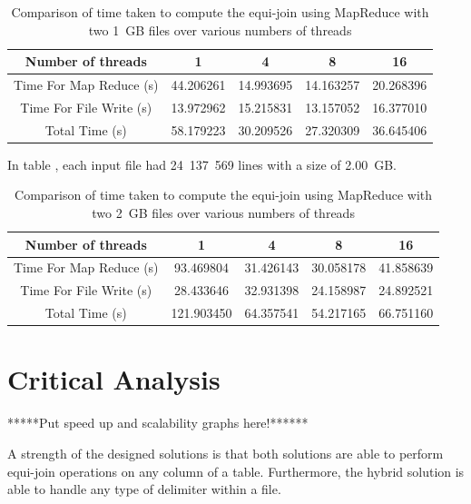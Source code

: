 \documentclass[10pt,twocolumn]{witseiepaper}
\begin{document}
\begin{table} [t]
	\centering
	\caption{Comparison of time taken to compute the equi-join using MapReduce with two 1~GB files over various numbers of threads}
	\label{tab:results2}
	
	\begin{tabular}{|c|c|c|c|c|}
		\hline 
		Number of threads & 1 & 4 & 8 &16\\ 
		\hline
		\hline
		Time For Map Reduce (s) & 44.206261 & 14.993695 & 14.163257 &20.268396\\ 
		\hline 
		Time For File Write (s) & 13.972962 & 15.215831 & 13.157052 &16.377010\\ 
		\hline 
		Total Time (s) & 58.179223 & 30.209526 & 27.320309 &  36.645406\\ 
		\hline 
	\end{tabular} 
\end{table}

In table , each input file had 24~137~569  lines with a size of 2.00~GB. 

\begin{table} [t]
	\centering
	\caption{Comparison of time taken to compute the equi-join using MapReduce with two 2~GB files over various numbers of threads}
	\label{tab:results3}
	
	\begin{tabular}{|c|c|c|c|c|}
		\hline 
		Number of threads & 1 & 4 & 8 &16\\ 
		\hline
		\hline
		Time For Map Reduce (s) & 93.469804 & 31.426143 & 30.058178 & 41.858639\\ 
		\hline 
		Time For File Write (s) & 28.433646 & 32.931398& 24.158987 & 24.892521\\ 
		\hline 
		Total Time (s) & 121.903450 & 64.357541 & 54.217165 & 66.751160 \\ 
		\hline 
	\end{tabular} 
\end{table}


\section{Critical Analysis}

*****Put speed up and scalability graphs here!******


A strength of the designed solutions is that both solutions are able to perform equi-join operations on any column of a table. Furthermore, the hybrid solution is able to handle any type of delimiter within a file.
\end{document}
